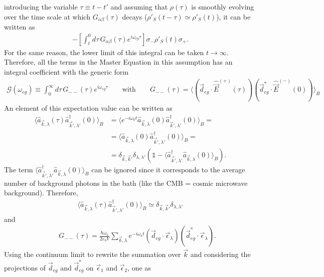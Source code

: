 introducing the variable $\tau \equiv t-t'$ and assuming that $\rho(\tau)$ is smoothly evolving over the time scale at which $G_{\alpha \beta}(\tau)$ decays ($\rho'_S(t-\tau) \simeq \rho'_S(t)$), it can be written as 
\begin{align*}
    - \left[\int_t^0 d\tau \, G_{\alpha \beta}(\tau) e^{i \omega_{eg}\tau} \right]\sigma_- \rho'_S(t) \sigma_+. 
\end{align*}
For the same reason, the lower limit of this integral can be taken $t\to\infty$. Therefore, all the terms in the Master Equation in this assumption has an integral coefficient with the generic form
\begin{align*}
    \mathcal{G}(\omega_{eg}) \equiv \int_0^\infty d \tau \, G_{--}(\tau) e^{i \omega_{eg} \tau} \qquad \text{with} \qquad G_{--}(\tau) = \langle \left( \vec{d}_{eg} \cdot \hat{\vec{E}}^{(+)}(\tau) \right) \left( \vec{d}_{eg}^* \cdot \hat{\vec{E}}^{(-)}(0)\right)  \rangle_B  
\end{align*}
An element of this expectation value can be written as 
\begin{align*}
    \langle \hat{a}_{\vec{k},\lambda}(\tau) \hat{a}^\dagger_{\vec{k}',\lambda'}(0)\rangle_B &= \langle e^{-i \omega_k t} \hat{a}_{\vec{k},\lambda}(0) \hat{a}^\dagger_{\vec{k}',\lambda'}(0)\rangle_B = \\ &= \langle \hat{a}_{\vec{k},\lambda}(0) \hat{a}^\dagger_{\vec{k}',\lambda'}(0)\rangle_B = \\
    & = \delta_{\vec{k},\vec{k}'} \delta_{\lambda,\lambda'} \left(\mathbb{1}-\langle \hat{a}^\dagger_{\vec{k}',\lambda'} \hat{a}_{\vec{k},\lambda}(0)\rangle_B\right). 
\end{align*}
The term $\langle \hat{a}^\dagger_{\vec{k}',\lambda'}\hat{a}_{\vec{k},\lambda}(0)\rangle_B$ can be ignored since it corresponds to the average number of background photons in the bath (like the CMB = cosmic microwave background). Therefore, 
\begin{align}
    \langle \hat{a}_{\vec{k},\lambda}(\tau) \hat{a}^\dagger_{\vec{k}',\lambda'}(0)\rangle_B \simeq \delta_{\vec{k},\vec{k}'} \delta_{\lambda,\lambda'}
\end{align}
and 
\begin{align*}
    \qquad G_{--}(\tau) = \frac{\hbar \omega_k}{2 \varepsilon_0 V} \sum_{\vec{k},\lambda} e^{-i\omega_k t} \left( \vec{d}_{eg} \cdot \vec{\epsilon}_\lambda \right)\left( \vec{d}_{eg}^* \cdot \vec{\epsilon}_\lambda \right). 
\end{align*}
Using the continuum limit to rewrite the summation over $\vec{k}$ and considering the projections of $\vec{d}_{eg}$ and $\vec{d}_{eg}^*$ on $\vec{\epsilon}_1$ and $\vec{\epsilon}_2$, one as 
